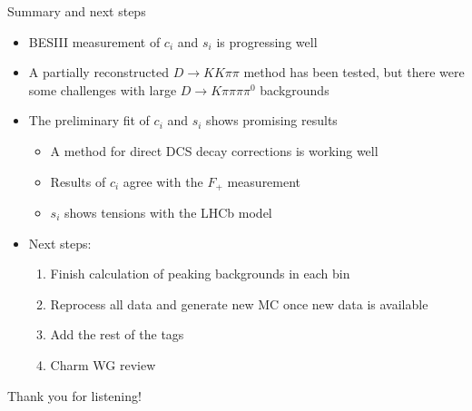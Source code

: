 \documentclass{beamer}
\begin{document}
\begin{frame}{Summary and next steps}
  \begin{itemize}
    \setlength\itemsep{0.8em}
    \item{BESIII measurement of $c_i$ and $s_i$ is progressing well}
    \item{A partially reconstructed $D\to KK\pi\pi$ method has been tested, but there were some challenges with large $D\to K\pi\pi\pi\pi^0$ backgrounds}
    \item{The preliminary fit of $c_i$ and $s_i$ shows promising results}
    \begin{itemize}
      \item{A method for direct DCS decay corrections is working well}
      \item{Results of $c_i$ agree with the $F_+$ measurement}
      \item{$s_i$ shows tensions with the LHCb model}
    \end{itemize}
    \item{Next steps:}
    \begin{enumerate}
      \item{Finish calculation of peaking backgrounds in each bin}
      \item{Reprocess all data and generate new MC once new data is available}
      \item{Add the rest of the tags}
      \item{Charm WG review}
    \end{enumerate}
  \end{itemize}
  \begin{center}
    \huge Thank you for listening!
  \end{center}
\end{frame}
\end{document}
